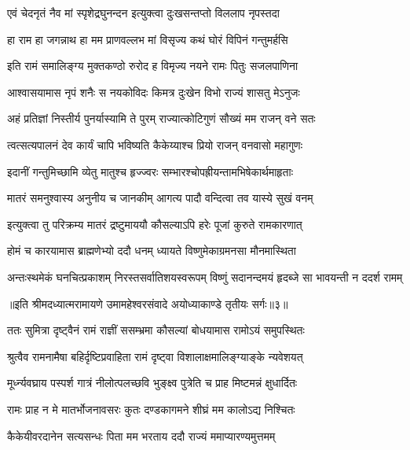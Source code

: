 \twolineshloka
{एवं चेदनृतं नैव मां स्पृशेद्रघुनन्दन}
{इत्युक्त्वा दुःखसन्तप्तो विललाप नृपस्तदा} %

\twolineshloka
{हा राम हा जगन्नाथ हा मम प्राणवल्लभ}
{मां विसृज्य कथं घोरं विपिनं गन्तुमर्हसि} %

\twolineshloka
{इति रामं समालिङ्ग्य मुक्तकण्ठो रुरोद ह}
{विमृज्य नयने रामः पितुः सजलपाणिना} %

\twolineshloka
{आश्वासयामास नृपं शनैः स नयकोविदः}
{किमत्र दुःखेन विभो राज्यं शासतु मेऽनुजः} %

\twolineshloka
{अहं प्रतिज्ञां निस्तीर्य पुनर्यास्यामि ते पुरम्}
{राज्यात्कोटिगुणं सौख्यं मम राजन् वने सतः} %

\twolineshloka
{त्वत्सत्यपालनं देव कार्यं चापि भविष्यति}
{कैकेय्याश्च प्रियो राजन् वनवासो महागुणः} %

\twolineshloka
{इदानीं गन्तुमिच्छामि व्येतु मातुश्च हृज्ज्वरः}
{सम्भारश्चोपह्रीयन्तामभिषेकार्थमाहृताः} %

\twolineshloka
{मातरं समनुश्वास्य अनुनीय च जानकीम्}
{आगत्य पादौ वन्दित्वा तव यास्ये सुखं वनम्} %

\twolineshloka
{इत्युक्त्वा तु परिक्रम्य मातरं द्रष्टुमाययौ}
{कौसल्याऽपि हरेः पूजां कुरुते रामकारणात्} %

\twolineshloka
{होमं च कारयामास ब्राह्मणेभ्यो ददौ धनम्}
{ध्यायते विष्णुमेकाग्रमनसा मौनमास्थिता} %

\fourlineindentedshloka
{अन्तःस्थमेकं घनचित्प्रकाशम्}
{निरस्तसर्वातिशयस्वरूपम्}
{विष्णुं सदानन्दमयं हृदब्जे}
{सा भावयन्ती न ददर्श रामम्} %

{॥इति श्रीमदध्यात्मरामायणे उमामहेश्वरसंवादे
अयोध्याकाण्डे तृतीयः सर्गः॥३॥
}




\twolineshloka
{ततः सुमित्रा दृष्ट्वैनं रामं राज्ञीं ससम्भ्रमा}
{कौसल्यां बोधयामास रामोऽयं समुपस्थितः} %

\twolineshloka
{श्रुत्वैव रामनामैषा बहिर्दृष्टिप्रवाहिता}
{रामं दृष्ट्वा विशालाक्षमालिङ्ग्याङ्के न्यवेशयत्} %

\twolineshloka
{मूर्ध्न्यवघ्राय पस्पर्श गात्रं नीलोत्पलच्छवि}
{भुङ्क्ष्व पुत्रेति च प्राह मिष्टमन्नं क्षुधार्दितः} %

\twolineshloka
{रामः प्राह न मे मातर्भोजनावसरः कुतः}
{दण्डकागमने शीघ्रं मम कालोऽद्य निश्चितः} %

\twolineshloka
{कैकेयीवरदानेन सत्यसन्धः पिता मम}
{भरताय ददौ राज्यं ममाप्यारण्यमुत्तमम्} %

